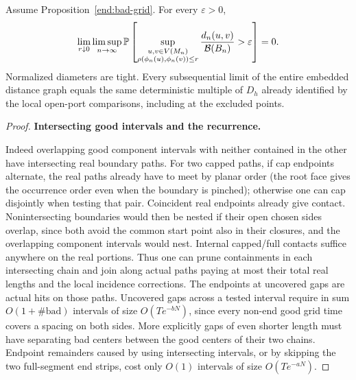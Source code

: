 \begin{proposition}\label{end:endpoint-reduction}
Assume Proposition~\ref{end:bad-grid}. For every $\varepsilon>0$,
\[
 \lim_{r\downarrow0}\limsup_{n\to\infty}
 \mathbb P\left[
 \sup_{\substack{u,v\in V(M_n)\\\rho(\phi_n(u),\phi_n(v))\le r}}
 \frac{d_n(u,v)}{\mathcal B(B_n)}>\varepsilon
 \right]=0.
\]
Normalized diameters are tight. Every subsequential limit of the entire embedded
distance graph equals the same deterministic multiple of $D_h$ already
identified by the local open-port comparisons, including at the excluded points.
\end{proposition}

\begin{proof}

\smallskip
\noindent\textbf{Intersecting good intervals and the recurrence.}\quad

Indeed overlapping good component intervals with neither contained in the other have
intersecting real boundary paths. For two capped paths, if cap endpoints alternate, the
real paths already have to meet by planar order (the root face gives the occurrence order
even when the boundary is pinched); otherwise one can cap disjointly when testing that
pair. Coincident real endpoints already give contact. Nonintersecting boundaries would
then be nested if their open chosen sides overlap, since both avoid the common start point
also in their closures, and the overlapping component intervals would nest. Internal
capped/full contacts suffice anywhere on the real portions. Thus one can prune
containments in each intersecting chain and join along actual paths paying at most their
total real lengths and the local incidence corrections. The endpoints at uncovered gaps
are actual hits on those paths. Uncovered gaps across a tested interval require in sum
\(O(1+\#\mathrm{bad})\) intervals of size \(O(T e^{-bN})\), since every non-end good grid
time covers a spacing on both sides. More explicitly gaps of even shorter length must have
separating bad centers between the good centers of their two chains. Endpoint remainders
caused by using intersecting intervals, or by skipping the two full-segment end strips,
cost only \(O(1)\) intervals of size \(O(T e^{-aN})\).


\end{proof}
